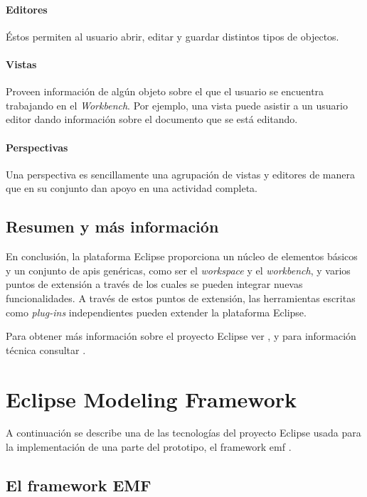 \documentclass[a4paper,12pt,twoside,spanish,openright]{book}
\begin{document}
\paragraph{Editores} Éstos permiten al usuario abrir, editar y guardar distintos tipos de objectos.

\paragraph{Vistas} Proveen información de algún objeto sobre el que el usuario se encuentra trabajando en el \textit{Workbench}. Por ejemplo, una vista puede asistir a un usuario editor dando información sobre el documento que se está editando.

\paragraph{Perspectivas} Una perspectiva es sencillamente una agrupación de vistas y editores de manera que en su conjunto dan apoyo en una actividad completa.


\subsection{Resumen y más información}

En conclusión, la plataforma \textsf{Eclipse} proporciona un núcleo de elementos básicos y un conjunto de \glspl{api} genéricas, como ser el \textit{workspace} y el \textit{workbench}, y varios puntos de extensión a través de los cuales se pueden integrar nuevas funcionalidades. A través de estos puntos de extensión, las herramientas escritas como \textit{plug-ins} independientes pueden extender la plataforma \textsf{Eclipse}.

Para obtener más información sobre el proyecto \textsf{Eclipse} ver \cite[\url{www.eclipse.org}]{Eclipse}, y para información técnica consultar \cite[Eclipse Platform Technical Overview]{EclipseTech}.


\section{Eclipse Modeling Framework}

A continuación se describe una de las tecnologías del proyecto \textsf{Eclipse} usada para la implementación de una parte del prototipo, el framework \gls{emf} \cite{EMF}.

\subsection{El framework EMF}
\end{document}
